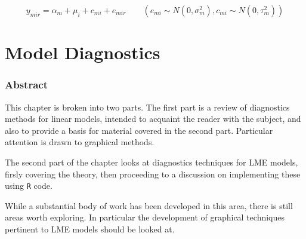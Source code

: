 \documentclass[12pt, a4paper]{report}
\theoremstyle{plain}
\theoremstyle{definition}
\theoremstyle{remark}
\begin{document}
\begin{equation}
y_{mir}  = \alpha_{m} + \mu_{i} + c_{mi} + e_{mir} \qquad ( e_{mi}
\sim N(0,\sigma^{2}_{m}), c_{mi} \sim N(0,\tau^{2}_{m}))
\end{equation}






\chapter{Model Diagnostics}
\tableofcontents
\newpage

\subsection*{Abstract}
This chapter is broken into two parts. The first part is a review of diagnostics methods for linear models, intended to acquaint the reader with the subject, and also to provide a basis for material covered in the second part. Particular attention is drawn to graphical methods.

The second part of the chapter looks at diagnostics techniques for LME models, firsly covering the theory, then proceeding to a discussion on 
implementing these using \texttt{R} code.

While a substantial body of work has been developed in this area, there is still areas worth exploring. 
In particular the development of graphical techniques pertinent to LME models should be looked at.




%
%
%
%
\end{document}
